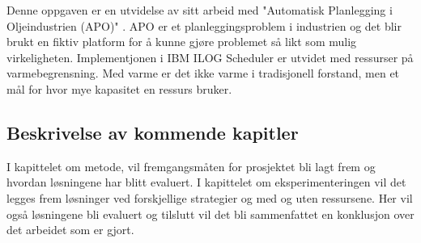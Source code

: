 Denne oppgaven er en utvidelse av \bht sitt arbeid med "Automatisk Planlegging i Oljeindustrien (APO)" \cite{tvedtbezem}. APO er et planleggingsproblem i industrien og det blir brukt en fiktiv platform for å kunne gjøre problemet så likt som mulig virkeligheten. Implementjonen i IBM ILOG Scheduler er utvidet med ressurser på varmebegrensning. Med varme er det ikke varme i tradisjonell forstand, men et mål for hvor mye kapasitet en ressurs bruker.

\subsection{Beskrivelse av kommende kapitler}
I kapittelet om metode, vil fremgangsmåten for prosjektet bli lagt frem og hvordan løsningene har blitt evaluert. I kapittelet om eksperimenteringen vil det legges frem løsninger ved forskjellige strategier og med og uten ressursene. Her vil også løsningene bli evaluert og tilslutt vil det bli sammenfattet en konklusjon over det arbeidet som er gjort.